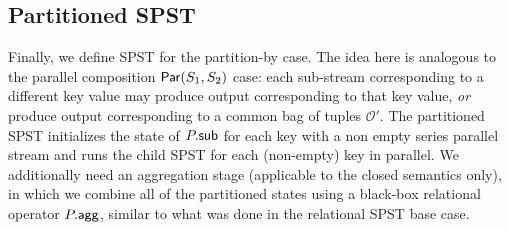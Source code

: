 

\subsection{Partitioned SPST}

Finally, we define SPST for the partition-by case.
The idea here is analogous to the parallel composition $\mathsf{Par}({S_1}, {S_2})$ case: each sub-stream corresponding to a different key value may produce output corresponding to that key value, \emph{or} produce output corresponding to a common bag of tuples $\mathcal{O}'$.
The partitioned SPST initializes the state of ${P}.{\mathsf{sub}}$ for each key with a non empty series parallel stream and runs the child SPST for each (non-empty) key in parallel.
We additionally need an aggregation stage (applicable to the closed semantics only),
in which we combine all of the partitioned states
using a black-box relational operator ${P}.{\mathsf{agg}}$,
similar to what was done in the relational SPST base case.

